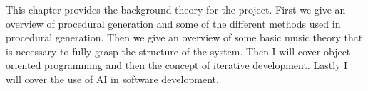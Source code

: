 
This chapter provides the background theory for the project. First we give an overview of procedural generation and some of the different methods used in procedural generation. Then we give an overview of some basic music theory that is necessary to fully grasp the structure of the system. Then I will cover object oriented programming and then the concept of iterative development. Lastly I will cover the use of \ac{AI} in software development.



\clearpage{}


\clearpage{}


\clearpage{}


\clearpage{}

